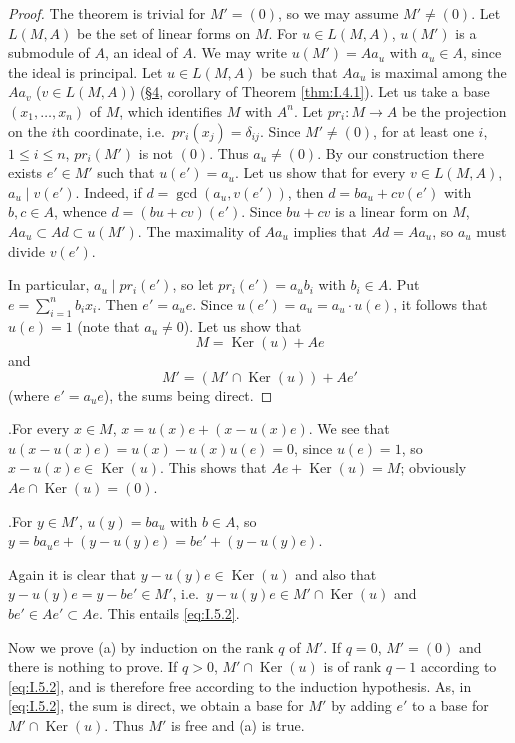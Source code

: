 \begin{proof}
The theorem is trivial for $M'=(0)$, so we may assume $M'\neq(0)$. Let
$L(M,A)$ be the set of linear forms on $M$. For $u\in L(M,A)$, $u(M')$ is a
submodule of $A$, an ideal of $A$. We may write $u(M')=Aa_{u}$ with
$a_{u}\in A$, since the ideal is principal. Let $u\in L(M,A)$ be such that
$Aa_{u}$ is maximal among the $Aa_{v}$ ($v\in L(M,A)$) (\hyperref[sec:1.4]{§4}, corollary of
Theorem \ref{thm:I.4.1}). Let us take a base $(x_{1},\ldots,x_{n})$ of $M$,
which identifies $M$ with $A^{n}$. Let $pr_{i}:M\to A$ be the projection on
the $i$th coordinate, i.e.\ $pr_{i}(x_{j})=\delta_{ij}$. Since
$M'\neq(0)$, for at least one $i$, $1\leq i\leq n$, $pr_{i}(M')$ is not
$(0)$. Thus $a_{u}\neq(0)$. By our construction there exists $e'\in M'$ such
that $u(e')=a_{u}$. Let us show that for every $v\in L(M,A)$,
$a_{u}\mid v(e')$. Indeed, if $d=\gcd(a_{u},v(e'))$, then
$d=ba_{u}+cv(e')$ with $b,c\in A$, whence $d=(bu+cv)(e')$. Since $bu+cv$ is
a linear form on $M$, $Aa_{u}\subset Ad\subset u(M')$. The maximality of
$Aa_{u}$ implies that $Ad=Aa_{u}$, so $a_{u}$ must divide $v(e')$.

In particular, $a_{u}\mid pr_{i}(e')$, so let $pr_{i}(e')=a_{u}b_{i}$ with
$b_{i}\in A$. Put $e=\sum_{i=1}^{n}b_{i}x_{i}$. Then $e'=a_{u}e$. Since
$u(e')=a_{u}=a_{u}\cdot u(e)$, it follows that $u(e)=1$ (note that
$a_{u}\neq0$). Let us show that
\begin{equation}
M=\operatorname{Ker}(u)+Ae
\label{eq:I.5.1}
\end{equation}
and
\begin{equation}
M'=(M'\cap\operatorname{Ker}(u))+Ae'
\label{eq:I.5.2}
\end{equation}
(where $e'=a_{u}e$), the sums being direct.
\end{proof}

.\quad For every $x\in M$,
$x=u(x)e+(x-u(x)e)$. We see that
$u(x-u(x)e)=u(x)-u(x)u(e)=0$, since $u(e)=1$, so
$x-u(x)e\in\operatorname{Ker}(u)$. This shows that
$Ae+\operatorname{Ker}(u)=M$; obviously
$Ae\cap\operatorname{Ker}(u)=(0)$.

.\quad For $y\in M'$, $u(y)=ba_{u}$ with $b\in A$, so
$y=ba_{u}e+(y-u(y)e)=be'+(y-u(y)e)$.

Again it is clear that $y-u(y)e\in\operatorname{Ker}(u)$ and also that
$y-u(y)e=y-be'\in M'$, i.e.\
$y-u(y)e\in M'\cap\operatorname{Ker}(u)$ and $be'\in Ae'\subset Ae$. This
entails \eqref{eq:I.5.2}.

Now we prove (a) by induction on the rank $q$ of $M'$. If $q=0$, $M'=(0)$
and there is nothing to prove. If $q>0$,
$M'\cap\operatorname{Ker}(u)$ is of rank $q-1$ according to
\eqref{eq:I.5.2}, and is therefore free according to the induction
hypothesis. As, in \eqref{eq:I.5.2}, the sum is direct, we obtain a base for
$M'$ by adding $e'$ to a base for $M'\cap\operatorname{Ker}(u)$. Thus $M'$
is free and (a) is true.

